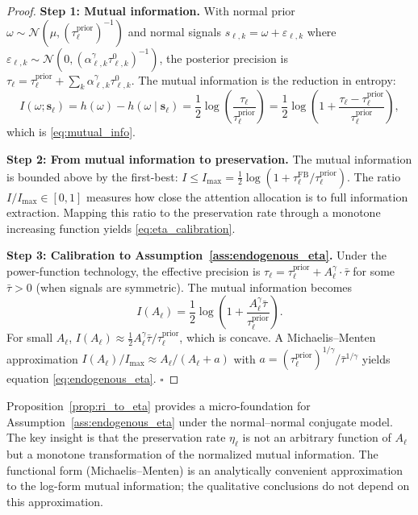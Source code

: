 \begin{proof}
\textbf{Step 1: Mutual information.} With normal prior $\omega \sim \mathcal{N}(\mu, (\tau^{\text{prior}}_\ell)^{-1})$ and normal signals $s_{\ell,k} = \omega + \varepsilon_{\ell,k}$ where $\varepsilon_{\ell,k} \sim \mathcal{N}(0, (\alpha^\gamma_{\ell,k} \tau^0_{\ell,k})^{-1})$, the posterior precision is $\tau_\ell = \tau^{\text{prior}}_\ell + \sum_k \alpha^\gamma_{\ell,k} \tau^0_{\ell,k}$. The mutual information is the reduction in entropy:
\begin{equation*}
I(\omega; \mathbf{s}_\ell) = h(\omega) - h(\omega \mid \mathbf{s}_\ell) = \frac{1}{2}\log\left(\frac{\tau_\ell}{\tau^{\text{prior}}_\ell}\right) = \frac{1}{2}\log\left(1 + \frac{\tau_\ell - \tau^{\text{prior}}_\ell}{\tau^{\text{prior}}_\ell}\right),
\end{equation*}
which is \eqref{eq:mutual_info}.

\textbf{Step 2: From mutual information to preservation.} The mutual information is bounded above by the first-best: $I \leq I_{\max} = \frac{1}{2}\log(1 + \tau^{\text{FB}}_\ell / \tau^{\text{prior}}_\ell)$. The ratio $I / I_{\max} \in [0,1]$ measures how close the attention allocation is to full information extraction. Mapping this ratio to the preservation rate through a monotone increasing function yields \eqref{eq:eta_calibration}.

\textbf{Step 3: Calibration to Assumption~\ref{ass:endogenous_eta}.} Under the power-function technology, the effective precision is $\tau_\ell = \tau^{\text{prior}}_\ell + A^\gamma_\ell \cdot \bar{\tau}$ for some $\bar{\tau} > 0$ (when signals are symmetric). The mutual information becomes
\begin{equation*}
I(A_\ell) = \frac{1}{2}\log\left(1 + \frac{A^\gamma_\ell \bar{\tau}}{\tau^{\text{prior}}_\ell}\right).
\end{equation*}
For small $A_\ell$, $I(A_\ell) \approx \frac{1}{2} A^\gamma_\ell \bar{\tau} / \tau^{\text{prior}}_\ell$, which is concave. A Michaelis--Menten approximation $I(A_\ell) / I_{\max} \approx A_\ell / (A_\ell + a)$ with $a = (\tau^{\text{prior}}_\ell)^{1/\gamma} / \bar{\tau}^{1/\gamma}$ yields equation \eqref{eq:endogenous_eta}. \hfill $\square$
\end{proof}

\begin{remark}
Proposition~\ref{prop:ri_to_eta} provides a micro-foundation for Assumption~\ref{ass:endogenous_eta} under the normal--normal conjugate model. The key insight is that the preservation rate $\eta_\ell$ is not an arbitrary function of $A_\ell$ but a monotone transformation of the normalized mutual information. The functional form (Michaelis--Menten) is an analytically convenient approximation to the log-form mutual information; the qualitative conclusions do not depend on this approximation.
\end{remark}

